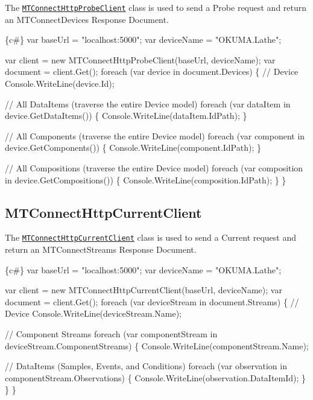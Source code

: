The \href{MTConnectHttpProbeClient.cs}{\tt M\+T\+Connect\+Http\+Probe\+Client} class is used to send a Probe request and return an M\+T\+Connect\+Devices Response Document. 
\begin{DoxyCode}
\{c#\}
var baseUrl = "localhost:5000";
var deviceName = "OKUMA.Lathe";

var client = new MTConnectHttpProbeClient(baseUrl, deviceName);
var document = client.Get();
foreach (var device in document.Devices)
\{
    // Device
    Console.WriteLine(device.Id);

    // All DataItems (traverse the entire Device model)
    foreach (var dataItem in device.GetDataItems())
    \{
        Console.WriteLine(dataItem.IdPath);
    \}

    // All Components (traverse the entire Device model)
    foreach (var component in device.GetComponents())
    \{
        Console.WriteLine(component.IdPath);
    \}

    // All Compositions (traverse the entire Device model)
    foreach (var composition in device.GetCompositions())
    \{
        Console.WriteLine(composition.IdPath);
    \}
\}
\end{DoxyCode}


\subsection*{M\+T\+Connect\+Http\+Current\+Client}

The \href{MTConnectHttpCurrentClient.cs}{\tt M\+T\+Connect\+Http\+Current\+Client} class is used to send a Current request and return an M\+T\+Connect\+Streams Response Document. 
\begin{DoxyCode}
\{c#\}
var baseUrl = "localhost:5000";
var deviceName = "OKUMA.Lathe";

var client = new MTConnectHttpCurrentClient(baseUrl, deviceName);
var document = client.Get();
foreach (var deviceStream in document.Streams)
\{
    // Device
    Console.WriteLine(deviceStream.Name);

    // Component Streams
    foreach (var componentStream in deviceStream.ComponentStreams)
    \{
        Console.WriteLine(componentStream.Name);

        // DataItems (Samples, Events, and Conditions)
        foreach (var observation in componentStream.Observations)
        \{
            Console.WriteLine(observation.DataItemId);
        \}
    \}
\}
\end{DoxyCode}


